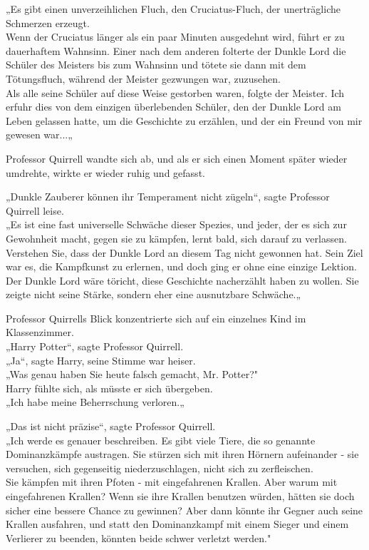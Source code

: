 {„Es gibt einen unverzeihlichen Fluch, den Cruciatus-Fluch, der unerträgliche Schmerzen erzeugt.\\ Wenn der Cruciatus länger als ein paar Minuten ausgedehnt wird, führt er zu dauerhaftem Wahnsinn. Einer nach dem anderen folterte der Dunkle Lord die Schüler des Meisters bis zum Wahnsinn und tötete sie dann mit dem Tötungsfluch, während der Meister gezwungen war, zuzusehen.\\ Als alle seine Schüler auf diese Weise gestorben waren, folgte der Meister. Ich erfuhr dies von dem einzigen überlebenden Schüler, den der Dunkle Lord am Leben gelassen hatte, um die Geschichte zu erzählen, und der ein Freund von mir gewesen war...„

Professor Quirrell wandte sich ab, und als er sich einen Moment später wieder umdrehte, wirkte er wieder ruhig und gefasst.

„Dunkle Zauberer können ihr Temperament nicht zügeln“, sagte Professor Quirrell leise.\\ „Es ist eine fast universelle Schwäche dieser Spezies, und jeder, der es sich zur Gewohnheit macht, gegen sie zu kämpfen, lernt bald, sich darauf zu verlassen.\\ Verstehen Sie, dass der Dunkle Lord an diesem Tag nicht gewonnen hat. Sein Ziel war es, die Kampfkunst zu erlernen, und doch ging er ohne eine einzige Lektion.\\ Der Dunkle Lord wäre töricht, diese Geschichte nacherzählt haben zu wollen. Sie zeigte nicht seine Stärke, sondern eher eine ausnutzbare Schwäche.„

Professor Quirrells Blick konzentrierte sich auf ein einzelnes Kind im Klassenzimmer.\\ „Harry Potter“, sagte Professor Quirrell.\\ „Ja“, sagte Harry, seine Stimme war heiser.\\ „Was genau haben Sie heute falsch gemacht, Mr. Potter?"\\ Harry fühlte sich, als müsste er sich übergeben.\\ „Ich habe meine Beherrschung verloren.„

„Das ist nicht präzise“, sagte Professor Quirrell.\\ „Ich werde es genauer beschreiben. Es gibt viele Tiere, die so genannte Dominanzkämpfe austragen. Sie stürzen sich mit ihren Hörnern aufeinander - sie versuchen, sich gegenseitig niederzuschlagen, nicht sich zu zerfleischen.\\ Sie kämpfen mit ihren Pfoten - mit eingefahrenen Krallen. Aber warum mit eingefahrenen Krallen? Wenn sie ihre Krallen benutzen würden, hätten sie doch sicher eine bessere Chance zu gewinnen? Aber dann könnte ihr Gegner auch seine Krallen ausfahren, und statt den Dominanzkampf mit einem Sieger und einem Verlierer zu beenden, könnten beide schwer verletzt werden."

}
